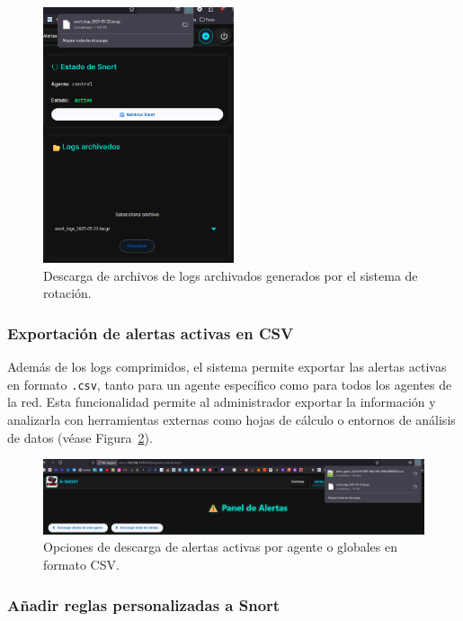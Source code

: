 \documentclass[11pt,a4paper,twoside]{report}
\begin{document}
\begin{figure}[H]
	\centering
	\includegraphics[width=0.5\textwidth]{pruebas/3.png}
	\caption{Descarga de archivos de logs archivados generados por el sistema de rotación.}
	\label{fig:descarga_logs_archivados}
\end{figure}

\subsubsection{Exportación de alertas activas en CSV}

Además de los logs comprimidos, el sistema permite exportar las alertas activas en formato \texttt{.csv}, tanto para un agente específico como para todos los agentes de la red. Esta funcionalidad permite al administrador exportar la información y analizarla con herramientas externas como hojas de cálculo o entornos de análisis de datos (véase Figura~\ref{fig:descarga_alertas_csv}).

\begin{figure}[H]
	\centering
	\includegraphics[width=1\textwidth]{pruebas/4.png}
	\caption{Opciones de descarga de alertas activas por agente o globales en formato CSV.}
	\label{fig:descarga_alertas_csv}
\end{figure}

\subsubsection{Añadir reglas personalizadas a Snort}
\end{document}
